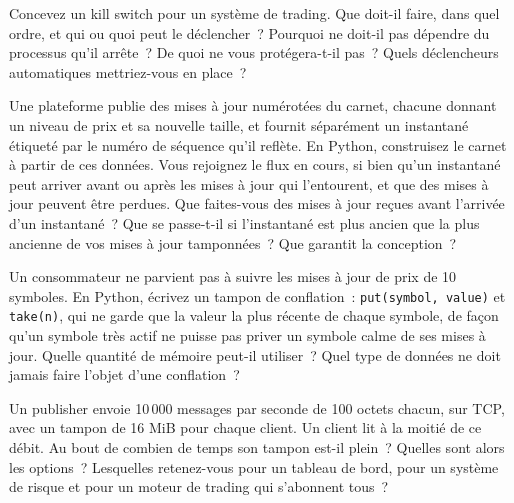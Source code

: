 \begin{question}\label{iq:iv3:system-design:12}
Concevez un kill switch pour un système de trading. Que doit-il faire, dans quel ordre, et qui ou quoi peut le déclencher~? Pourquoi ne doit-il pas dépendre du processus qu'il arrête~? De quoi ne vous protégera-t-il pas~? Quels déclencheurs automatiques mettriez-vous en place~?
\end{question}

\begin{question}\label{iq:iv3:system-design:13}
Une plateforme publie des mises à jour numérotées du carnet, chacune donnant un niveau de prix et sa nouvelle taille, et fournit séparément un instantané étiqueté par le numéro de séquence qu'il reflète. En Python, construisez le carnet à partir de ces données. Vous rejoignez le flux en cours, si bien qu'un instantané peut arriver avant ou après les mises à jour qui l'entourent, et que des mises à jour peuvent être perdues. Que faites-vous des mises à jour reçues avant l'arrivée d'un instantané~? Que se passe-t-il si l'instantané est plus ancien que la plus ancienne de vos mises à jour tamponnées~? Que garantit la conception~?
\end{question}

\begin{question}\label{iq:iv3:system-design:14}
Un consommateur ne parvient pas à suivre les mises à jour de prix de 10 symboles. En Python, écrivez un tampon de conflation~: \texttt{put(symbol, value)} et \texttt{take(n)}, qui ne garde que la valeur la plus récente de chaque symbole, de façon qu'un symbole très actif ne puisse pas priver un symbole calme de ses mises à jour. Quelle quantité de mémoire peut-il utiliser~? Quel type de données ne doit jamais faire l'objet d'une conflation~?
\end{question}

\begin{question}\label{iq:iv3:system-design:15}
Un publisher envoie 10\,000 messages par seconde de 100 octets chacun, sur TCP, avec un tampon de 16 MiB pour chaque client. Un client lit à la moitié de ce débit. Au bout de combien de temps son tampon est-il plein~? Quelles sont alors les options~? Lesquelles retenez-vous pour un tableau de bord, pour un système de risque et pour un moteur de trading qui s'abonnent tous~?
\end{question}

